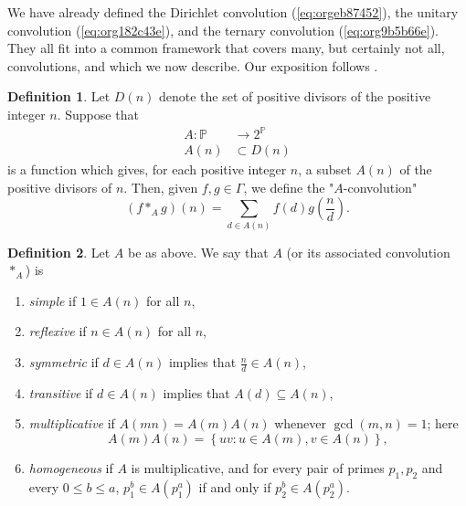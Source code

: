 \documentclass[12pt]{article}
\theoremstyle{definition}
\newtheorem{definition}{Definition}
\theoremstyle{remark}
\theoremstyle{plain}
\newcommand\setsuchas[2]{\left\{{#1}:{#2}\right\}}
\newcommand{\NNp}{{\mathbb{P}}}
\newcommand{\divisors}[1]{{D(#1)}}
\begin{document}
We have already defined the Dirichlet convolution (\ref{eq:orgeb87452}), the unitary convolution
(\ref{eq:org182c43e}), and the ternary convolution (\ref{eq:org9b5b66e}). They all fit into a common
framework that covers many, but certainly not all, convolutions, and which we now describe. Our
exposition follows \cite{BurnettGeneralAfunctions}.

\begin{definition}
Let \(\divisors{n}\) denote the set of positive divisors of the positive integer \(n\).
Suppose that
\begin{equation}
\label{eq:orgb56f580}
\begin{split}
  A: \NNp & \to 2^{\NNp}\\
  A(n) & \subset \divisors{n}
\end{split}
\end{equation}
is a function which gives, for each positive integer \(n\), a subset \(A(n)\) of the
positive divisors of \(n\).
Then, given \(f,g \in \Gamma\), we define the "\(A\)-convolution"
\begin{equation}
\label{eq:org1d03035}
(f*_{A}g)(n)= \sum_{d \in A(n)}f(d)g(\frac{n}{d}).
\end{equation}
\label{orgc6bd955}
\end{definition}

\begin{definition}
Let \(A\) be as above. We say that \(A\) (or its associated convolution \(*_{A}\)) is
\begin{enumerate}[label={(\alph*)}]
\item \emph{simple} if \(1 \in A(n)\) for all \(n\),
\item \emph{reflexive} if \(n \in A(n)\) for all \(n\),
\item \emph{symmetric} if \(d \in A(n)\) implies that \(\frac{n}{d} \in A(n)\),
\item \emph{transitive} if \(d \in A(n)\) implies that  \(A(d) \subseteq A(n)\),
\item \emph{multiplicative} if \(A(mn) = A(m)A(n)\) whenever \(\gcd(m,n)=1\); here
\[A(m)A(n) = \setsuchas{uv}{u \in A(m), v \in A(n)},\]
\item \emph{homogeneous} if \(A\) is multiplicative, and for every pair of primes \(p_{1},p_{2}\) and
every \(0 \le b \le a\), \(p_{1}^{b} \in A(p_{1}^{a})\) if and only if \(p_{2}^{b} \in A(p_{2}^{a})\).
\end{enumerate}
\label{org53816d8}
\end{definition}
\end{document}
